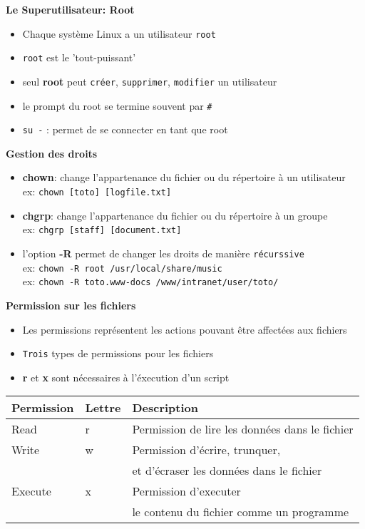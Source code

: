 \documentclass[french]{beamer}
\begin{document}
\begin{frame}
\textbf{Le Superutilisateur: Root}
    \begin{itemize}
    \item Chaque système Linux a un utilisateur \texttt{root}
    \item \texttt{root} est le 'tout-puissant'
    \item seul \textbf{root} peut \texttt{créer}, \texttt{supprimer},
    \texttt{modifier} un utilisateur
    \item le prompt du root se termine souvent par \texttt{\#}
    \item \texttt{su -} : permet de se connecter en tant que root
    \end{itemize}
\end{frame}

\begin{frame}
\textbf{Gestion des droits}
    \begin{itemize}
    \item \textbf{chown}: change l'appartenance du fichier ou du répertoire  à
    un utilisateur\\
    ex: \texttt{chown [toto] [logfile.txt]}
    \item \textbf{chgrp}: change l'appartenance du fichier ou du répertoire à
    un groupe \\
    ex: \texttt{chgrp [staff] [document.txt]}
    \item l'option \textbf{-R} permet de changer les droits de manière
    \texttt{récurssive} \\
    ex: \texttt{chown -R root /usr/local/share/music} \\
    ex: \texttt{chown -R toto.www-docs  /www/intranet/user/toto/}
    \end{itemize}
\end{frame}


\begin{frame}
\textbf{Permission sur les fichiers}
\begin{itemize}
\item Les permissions représentent les actions pouvant être affectées aux fichiers
\item \texttt{Trois} types de permissions pour les fichiers
\item \textbf{r} et \textbf{x} sont nécessaires à l'éxecution d'un script
\end{itemize}
\begin{tabular}{|l|l|l|}
   \hline
   \textbf{Permission} & \textbf{Lettre} & \textbf{Description} \\
   \hline
   Read & r & Permission de lire les données dans le fichier \\
   Write & w & Permission d'écrire, trunquer,\\ 
   & & et d'écraser les données dans le fichier \\
   Execute & x & Permission d'executer \\
   & & le contenu du fichier comme un programme\\
   \hline
\end{tabular}
\end{frame}
\end{document}
